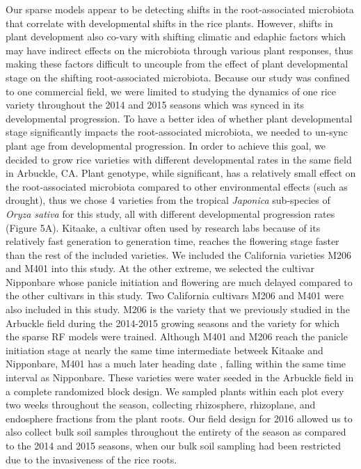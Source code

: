 Our sparse models appear to be detecting shifts in the root-associated microbiota that correlate with developmental shifts in the rice plants. However, shifts in plant development also co-vary with shifting climatic and edaphic factors which may have indirect effects on the microbiota through various plant responses, thus making these factors difficult to uncouple from the effect of plant developmental stage on the shifting root-associated microbiota. Because our study was confined to one commercial field, we were limited to studying the dynamics of one rice variety throughout the 2014 and 2015 seasons which was synced in its developmental progression. To have a better idea of whether plant developmental stage significantly impacts the root-associated microbiota, we needed to un-sync plant age from developmental progression. In order to achieve this goal, we decided to grow rice varieties with different developmental rates in the same field in Arbuckle, CA. Plant genotype, while significant, has a relatively small effect on the root-associated microbiota compared to other environmental effects (such as drought), thus we chose 4 varieties from the tropical \textit{Japonica} sub-species of \textit{Oryza sativa} for this study, all with different developmental progression rates (Figure 5A). Kitaake, a cultivar often used by research labs because of its relatively fast generation to generation time, reaches the flowering stage faster than the rest of the included varieties. We included the California varieties M206 and M401 into this study. At the other extreme, we selected the cultivar Nipponbare whose panicle initiation and flowering are much delayed compared to the other cultivars in this study. Two California cultivars M206 and M401 were also included in this study. M206 is the variety that we previously studied in the Arbuckle field during the 2014-2015 growing seasons and the variety for which the sparse RF models were trained. Although M401 and M206 reach the panicle initiation stage at nearly the same time intermediate betweek Kitaake and Nipponbare, M401 has a much later heading date \cite{Linquist2012}, falling within the same time interval as Nipponbare. These varieties were water seeded in the Arbuckle field in a complete randomized block design. We sampled plants within each plot every two weeks throughout the season, collecting rhizosphere, rhizoplane, and endosphere fractions from the plant roots. Our field design for 2016 allowed us to also collect bulk soil samples throughout the entirety of the season as compared to the 2014 and 2015 seasons, when our bulk soil sampling had been restricted due to the invasiveness of the rice roots. 

